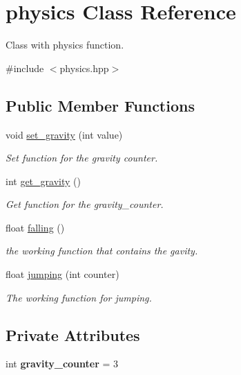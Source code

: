 \hypertarget{classphysics}{}\section{physics Class Reference}
\label{classphysics}


Class with physics function.  




{\ttfamily \#include $<$physics.\+hpp$>$}

\subsection*{Public Member Functions}
\begin{DoxyCompactItemize}
\item 
void \hyperlink{classphysics_a8b0dff646c304dee3cb5c095d821dc87}{set\+\_\+gravity} (int value)
\begin{DoxyCompactList}\small\item\em Set function for the gravity counter. \end{DoxyCompactList}\item 
int \hyperlink{classphysics_a3c4c6084fe0652b0bfd35afa5daa1c1e}{get\+\_\+gravity} ()
\begin{DoxyCompactList}\small\item\em Get function for the gravity\+\_\+counter. \end{DoxyCompactList}\item 
float \hyperlink{classphysics_acca1ee2fb8b760b6e4ee61ae7c2ee3da}{falling} ()
\begin{DoxyCompactList}\small\item\em the working function that contains the gavity. \end{DoxyCompactList}\item 
float \hyperlink{classphysics_aaf1c57aa6e35b9c83ccbfdfa8c18468c}{jumping} (int counter)
\begin{DoxyCompactList}\small\item\em The working function for jumping. \end{DoxyCompactList}\end{DoxyCompactItemize}
\subsection*{Private Attributes}
\begin{DoxyCompactItemize}
\item 
\mbox{\label{classphysics_a49345e47dcf7f97b9e1c20ba622cf5e4}} 
int {\bfseries gravity\+\_\+counter} = 3
\end{DoxyCompactItemize}


